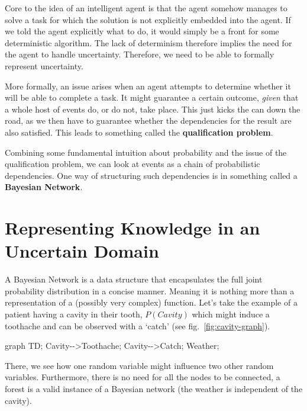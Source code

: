 \documentclass[
]{book}
\newenvironment{Shaded}{}{}
\newcommand{\NormalTok}[1]{#1}
\begin{document}
Core to the idea of an intelligent agent is that the agent somehow
manages to solve a task for which the solution is not explicitly
embedded into the agent. If we told the agent explicitly what to do, it
would simply be a front for some deterministic algorithm. The lack of
determinism therefore implies the need for the agent to handle
uncertainty. Therefore, we need to be able to formally represent
uncertainty.

More formally, an issue arises when an agent attempts to determine
whether it will be able to complete a task. It might guarantee a certain
outcome, \emph{given} that a whole host of events do, or do not, take
place. This just kicks the can down the road, as we then have to
guarantee whether the dependencies for the result are also satisfied.
This leads to something called the \textbf{qualification problem}.

Combining some fundamental intuition about probability and the issue of
the qualification problem, we can look at events as a chain of
probabilistic dependencies. One way of structuring such dependencies is
in something called a \textbf{Bayesian Network}.

\hypertarget{representing-knowledge-in-an-uncertain-domain}{%
\section{Representing Knowledge in an Uncertain
Domain}\label{representing-knowledge-in-an-uncertain-domain}}

A Bayesian Network is a data structure that encapsulates the full joint
probability distribution in a concise manner. Meaning it is nothing more
than a representation of a (possibly very complex) function. Let's take
the example of a patient having a cavity in their tooth, \(P(Cavity)\)
which might induce a toothache and can be observed with a `catch' (see
fig.~\ref{fig:cavity-graph}).

\hypertarget{fig:cavity-graph}{%
\label{fig:cavity-graph}}%
\begin{Shaded}
\begin{Highlighting}[]
\NormalTok{graph TD;}
\NormalTok{    Cavity{-}{-}\textgreater{}Toothache;}
\NormalTok{    Cavity{-}{-}\textgreater{}Catch;}
\NormalTok{    Weather;}
\end{Highlighting}
\end{Shaded}

There, we see how one random variable might influence two other random
variables. Furthermore, there is no need for all the nodes to be
connected, a forest is a valid instance of a Bayesian network (the
weather is independent of the cavity).
\end{document}
